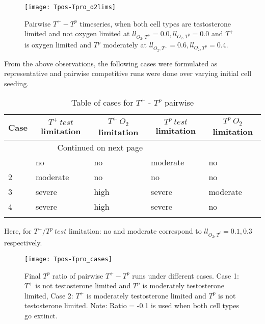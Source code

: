 \begin{figure}[h!]
\centering
\texttt{[image: Tpos-Tpro\_o2lims]}
\caption[Pairwise $T^+ - T^p$ timeseries, oxygen limitation]{Pairwise $T^+ - T^p$ timeseries, when both cell types are testosterone limited and not oxygen limited at $ll_{O_2,T^+}=0.0, ll_{O_2,T^p}=0.0$ and $T^+$ is oxygen limited and $T^p$ moderately at $ll_{O_2,T^+}=0.6, ll_{O_2,T^p}=0.4$.}
\label{fig_Tpos-Tpro_o2lims}
\end{figure}

From the above observations, the following cases were formulated as representative and pairwise competitive runs were done over varying initial cell seeding.

\begin{longtable}[c]{|l|l|l|l|l|}

  \hline \multicolumn{1}{|c|}{\textbf{Case}} & \multicolumn{1}{c|}{\textbf{$T^+\ test$ limitation}} & \multicolumn{1}{c|}{\textbf{$T^+\ O_2$ limitation}} & \multicolumn{1}{c|}{\textbf{$T^p\ test$ limitation}} & \multicolumn{1}{c|}{\textbf{$T^p\ O_2$ limitation}} \\ \hline
  \endhead

  \hline \multicolumn{3}{|r|}{{Continued on next page}} \\ \hline
  \endfoot

  \endlastfoot
  1 & no & no & moderate & no \\ \hline
  2 & moderate & no & no & no \\ \hline
  3 & severe & high & severe & moderate \\ \hline
  4 & severe & high & severe & no \\ \hline
  \caption{Table of cases for $T^+$ - $T^p$ pairwise}
  \label{tab_Tpro-Tneg_cases}

\end{longtable}

Here, for $T^+/T^p\ test$ limitation: no and moderate correspond to $ll_{O_2,T^i}=0.1, 0.3$ respectively.

\begin{figure}[h!]
  \centering
  \texttt{[image: Tpos-Tpro\_cases]}
  \caption[Final $T^p$ ratio of pairwise $T^+ - T^p$ runs under different cases]{Final $T^p$ ratio of pairwise $T^+ - T^p$ runs under different cases. Case 1: $T^+$ is not testosterone limited and $T^p$ is moderately testosterone limited, Case 2: $T^+$ is moderately testosterone limited and $T^p$ is not testosterone limited. Note: Ratio = -0.1 is used when both cell types go extinct.}
  \label{fig_Tpos-Tpro_cases}
\end{figure}

